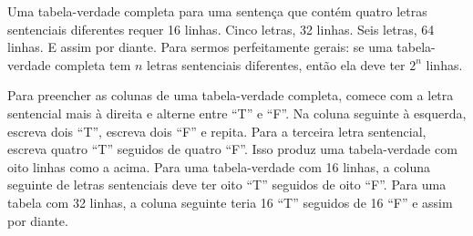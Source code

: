Uma tabela-verdade completa para uma sentença que contém quatro letras sentenciais diferentes requer 16 linhas. Cinco letras, 32 linhas. Seis letras, 64 linhas. E assim por diante. Para sermos perfeitamente gerais: se uma tabela-verdade completa tem $n$ letras sentenciais diferentes, então ela deve ter $2^n$ linhas.

Para preencher as colunas de uma tabela-verdade completa, comece com a letra sentencial mais à direita e alterne entre \textquotedblleft{}T\textquotedblright{} e \textquotedblleft{}F\textquotedblright{}. Na coluna seguinte à esquerda, escreva dois \textquotedblleft{}T\textquotedblright{}, escreva dois \textquotedblleft{}F\textquotedblright{} e repita. Para a terceira letra sentencial, escreva quatro \textquotedblleft{}T\textquotedblright{} seguidos de quatro \textquotedblleft{}F\textquotedblright{}. Isso produz uma tabela-verdade com oito linhas como a acima. Para uma tabela-verdade com 16 linhas, a coluna seguinte de letras sentenciais deve ter oito \textquotedblleft{}T\textquotedblright{} seguidos de oito \textquotedblleft{}F\textquotedblright{}. Para uma tabela com 32 linhas, a coluna seguinte teria 16 \textquotedblleft{}T\textquotedblright{} seguidos de 16 \textquotedblleft{}F\textquotedblright{} e assim por diante.

